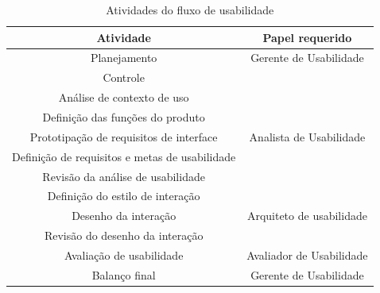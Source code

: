     \begin{table}[h]
        \begin{center}
    		\begin{tabular}{|c|c|}
    			\hline
                \textbf{Atividade} & \textbf{Papel requerido} \\ \hline
    			Planejamento & Gerente de Usabilidade \\
    			Controle  & \\
    			\hline
                Análise de contexto de uso &  \\
                Definição das funções do produto &  \\
                Prototipação de requisitos de interface & Analista de Usabilidade \\
                Definição de requisitos e metas de usabilidade & \\
                Revisão da análise de usabilidade & \\
                \hline
                Definição do estilo de interação & \\
                Desenho da interação & Arquiteto de usabilidade \\
                Revisão do desenho da interação & \\
                \hline
                Avaliação de usabilidade & Avaliador de Usabilidade  \\
                \hline
                Balanço final & Gerente de Usabilidade  \\
                \hline
    		\end{tabular}
    		\caption{Atividades do fluxo de usabilidade}
        	\label{tabFluxoUsa}
    	\end{center}
    \end{table}

